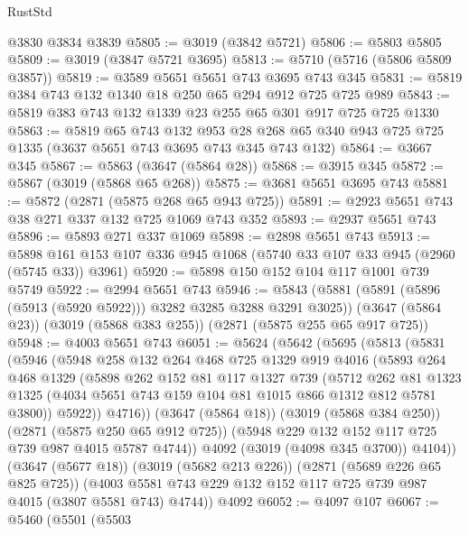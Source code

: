 \begin{lexlean}{RustStd}
\begin{coremodule}
    @3830
    @3834
    @3839
@5805 := @3019 (@3842 @5721)
@5806 := @5803 @5805
@5809 := @3019 (@3847 @5721 @3695)
@5813 := @5710 (@5716 (@5806 @5809 @3857))
@5819 := @3589 @5651 @5651 @743 @3695 @743 @345
@5831 := @5819 @384 @743 @132 @1340 @18 @250 @65 @294 @912 @725 @725 @989
@5843 := @5819 @383 @743 @132 @1339 @23 @255 @65 @301 @917 @725 @725 @1330
@5863 := @5819
    @65
    @743
    @132
    @953
    @28
    @268
    @65
    @340
    @943
    @725
    @725
    @1335
    (@3637 @5651 @743 @3695 @743 @345 @743 @132)
@5864 := @3667 @345
@5867 := @5863 (@3647 (@5864 @28))
@5868 := @3915 @345
@5872 := @5867 (@3019 (@5868 @65 @268))
@5875 := @3681 @5651 @3695 @743
@5881 := @5872 (@2871 (@5875 @268 @65 @943 @725))
@5891 := @2923 @5651 @743 @38 @271 @337 @132 @725 @1069 @743 @352
@5893 := @2937 @5651 @743
@5896 := @5893 @271 @337 @1069
@5898 := @2898 @5651 @743
@5913 := @5898 @161 @153 @107 @336 @945 @1068 (@5740 @33 @107 @33 @945 (@2960 (@5745 @33)) @3961)
@5920 := @5898 @150 @152 @104 @117 @1001 @739 @5749
@5922 := @2994 @5651 @743
@5946 := @5843
    (@5881 (@5891 (@5896 (@5913 (@5920 @5922))) @3282 @3285 @3288 @3291 @3025))
    (@3647 (@5864 @23))
    (@3019 (@5868 @383 @255))
    (@2871 (@5875 @255 @65 @917 @725))
@5948 := @4003 @5651 @743
@6051 := @5624
    (@5642
      (@5695
        (@5813
          (@5831
            (@5946
              (@5948
                @258
                @132
                @264
                @468
                @725
                @1329
                @919
                @4016
                (@5893
                  @264
                  @468
                  @1329
                  (@5898
                    @262
                    @152
                    @81
                    @117
                    @1327
                    @739
                    (@5712
                      @262
                      @81
                      @1323
                      @1325
                      (@4034 @5651 @743 @159 @104 @81 @1015 @866 @1312 @812 @5781 @3800))
                    @5922))
                @4716))
            (@3647 (@5864 @18))
            (@3019 (@5868 @384 @250))
            (@2871 (@5875 @250 @65 @912 @725))
            (@5948 @229 @132 @152 @117 @725 @739 @987 @4015 @5787 @4744))
          @4092
          (@3019 (@4098 @345 @3700))
          @4104))
      (@3647 (@5677 @18))
      (@3019 (@5682 @213 @226))
      (@2871 (@5689 @226 @65 @825 @725))
      (@4003 @5581 @743 @229 @132 @152 @117 @725 @739 @987 @4015 (@3807 @5581 @743) @4744))
    @4092
@6052 := @4097 @107
@6067 := @5460
    (@5501
      (@5503

\end{coremodule}
\end{lexlean}
